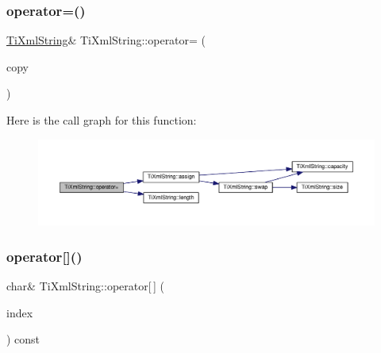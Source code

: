 \subsubsection{\texorpdfstring{operator=()}{operator=()}\hspace{0.1cm}{\footnotesize\ttfamily [2/2]}}
{\footnotesize\ttfamily \hyperlink{class_ti_xml_string}{Ti\+Xml\+String}\& Ti\+Xml\+String\+::operator= (\begin{DoxyParamCaption}\item[{const \hyperlink{class_ti_xml_string}{Ti\+Xml\+String} \&}]{copy }\end{DoxyParamCaption})\hspace{0.3cm}{\ttfamily [inline]}}

Here is the call graph for this function\+:
\nopagebreak
\begin{figure}[H]
\begin{center}
\leavevmode
\includegraphics[width=350pt]{class_ti_xml_string_ab1f1f5d3eceaa0f22d0a7e6055ea81b0_cgraph}
\end{center}
\end{figure}
\mbox{\label{class_ti_xml_string_a06e8c84831fc146610369405f4aa4200}} 
\subsubsection{\texorpdfstring{operator[]()}{operator[]()}}
{\footnotesize\ttfamily char\& Ti\+Xml\+String\+::operator\mbox{[}$\,$\mbox{]} (\begin{DoxyParamCaption}\item[{\hyperlink{class_ti_xml_string_abeb2c1893a04c17904f7c06546d0b971}{size\+\_\+type}}]{index }\end{DoxyParamCaption}) const\hspace{0.3cm}{\ttfamily [inline]}}

